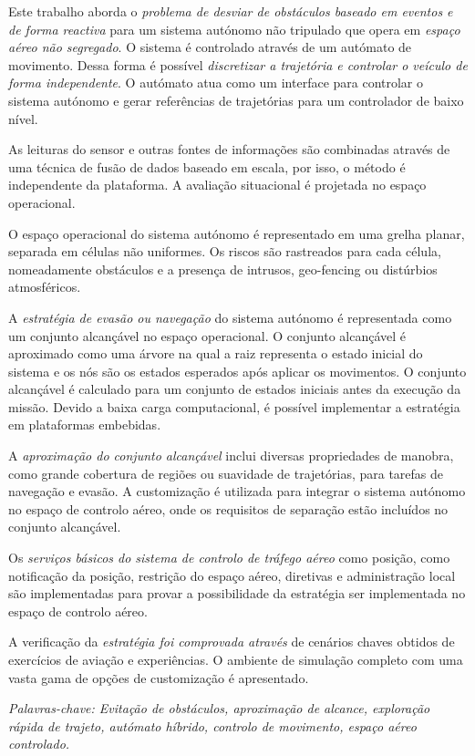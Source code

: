 \noindent Este trabalho aborda o \textit{problema de desviar de obstáculos baseado em eventos e de forma reactiva} para um sistema autónomo não tripulado que opera em \textit{espaço aéreo não segregado}. O sistema é controlado através de um autómato de movimento. Dessa forma é possível \textit{discretizar a trajetória e controlar o veículo de forma independente}. O autómato atua como um interface  para controlar o sistema autónomo e gerar referências de trajetórias para um controlador de baixo nível.

As leituras do sensor e outras fontes de informações são combinadas através de uma técnica de fusão de dados baseado em escala, por isso, o método é independente da plataforma. A avaliação situacional é projetada no espaço operacional.


O espaço operacional do sistema autónomo é representado em uma grelha planar, separada em células não uniformes. Os riscos são rastreados para cada célula, nomeadamente obstáculos e a presença de intrusos, geo-fencing ou distúrbios atmosféricos.


A\textit{ estratégia de evasão ou navegação} do sistema autónomo é representada como um conjunto alcançável no espaço operacional. O conjunto alcançável é aproximado como uma árvore na qual a raiz representa o estado inicial do sistema e os nós são os estados esperados após aplicar os movimentos. O conjunto alcançável é calculado para um conjunto de estados iniciais antes da execução da missão. Devido a baixa carga computacional, é possível implementar a estratégia em plataformas embebidas.

A \textit{aproximação do conjunto alcançável} inclui diversas propriedades de manobra, como grande cobertura de regiões ou suavidade de trajetórias, para tarefas de navegação e evasão. A customização é utilizada para integrar o sistema autónomo no espaço de controlo aéreo, onde os requisitos de separação estão incluídos no conjunto alcançável.

Os \textit{serviços básicos do sistema de controlo de tráfego aéreo} como posição, como notificação da posição, restrição do espaço aéreo, diretivas e administração local são implementadas para provar a possibilidade da estratégia ser implementada no espaço de controlo aéreo.


A verificação da \textit{estratégia foi comprovada através} de cenários chaves obtidos de exercícios de  aviação e experiências. O ambiente de simulação completo com uma vasta gama de opções de customização é apresentado.

\vskip 16pt
\noindent\emph{Palavras-chave: Evitação de obstáculos, aproximação de alcance, exploração rápida de trajeto, autómato híbrido, controlo de movimento, espaço aéreo controlado.}